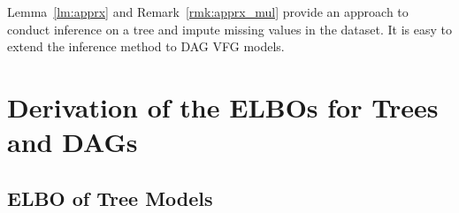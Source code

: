 \documentclass[twoside]{article}
\newtheorem{remark}{Remark}
\begin{document}
Lemma~\ref{lm:apprx} and Remark~\ref{rmk:apprx_mul} provide an approach to conduct inference on a tree and impute missing values in the dataset. It is easy to extend the inference method to DAG VFG models. 





\section{Derivation of the ELBOs for  Trees and DAGs }\label{sec:ebl_deri}
\subsection{ELBO of Tree Models}\label{appd:tree_elbo}
\end{document}
